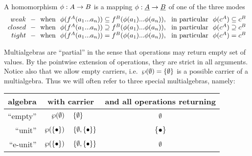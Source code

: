 \documentclass[10pt]{article}
\begin{document}
\begin{Definition}
A homomorphism $\phi:A\rightarrow B$ is a mapping $\phi: \underline {A}\rightarrow \underline {B}$ of one of the three modes 
\[
\begin{array}{r@{\ \ -\ \ {\rm when\ \ }}l@{,\ \ {\rm in\ particular\ \ }}l}
{\sl weak} & \phi(f^A(\lis a))\subseteq f^B(\clis a\phi()) & \phi(c^A)\subseteq c^B \\
{\sl closed}& \phi(f^A(\lis a))\supseteq f^B(\clis a\phi())  & \phi(c^A)\supseteq c^B \\
{\sl tight} & \phi(f^A(\lis a))= f^B(\clis a\phi())  & \phi(c^A)= c^B 
\end{array} 
\]
\end{Definition}
%
%

\noindent
Multialgebras are ``partial'' in the sense that operations may return
empty set of values. By the pointwise extension of operations, they
are strict in all arguments.  Notice also that we allow empty
carriers, i.e.\ $\wp(\emptyset)=\{\emptyset\}$ is a possible carrier of a
multialgebra. Thus we will often refer to three special multialgebras,
namely:

\begin{center}
\begin{tabular}{r|r@{\ =\ }l@{\ \ }c}
algebra     & \multicolumn{2}{c}{with carrier} & and all operations returning \\ \hline
``empty''   & $\wp(\emptyset)$ & $\{\emptyset\} $ & $\emptyset$ \\[.5ex]
``unit''    & $\wp(\{\bullet\})$ & $\{\emptyset,\{\bullet\}\}$ & $\{\bullet\}$  \\[.5ex]
``e-unit''  & $\wp(\{\bullet\})$ & $\{\emptyset,\{\bullet\}\}$ & $\emptyset$
\end{tabular} 
\end{center}
\end{document}
